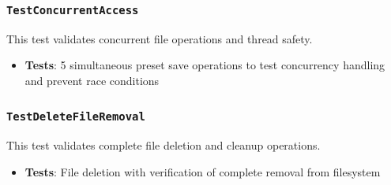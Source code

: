 \subsubsection*{\texttt{TestConcurrentAccess}}
This test validates concurrent file operations and thread safety.
\begin{itemize}
    \item \textbf{Tests}: 5 simultaneous preset save operations to test concurrency handling and prevent race conditions
\end{itemize}

\subsubsection*{\texttt{TestDeleteFileRemoval}}
This test validates complete file deletion and cleanup operations.
\begin{itemize}
    \item \textbf{Tests}: File deletion with verification of complete removal from filesystem
\end{itemize}
